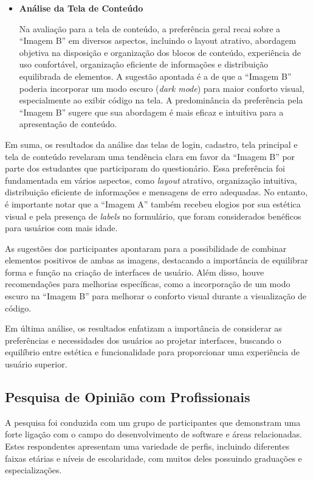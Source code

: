 \begin{itemize}
    \item \textbf{Análise da Tela de Conteúdo}
    
    Na avaliação para a tela de conteúdo, a preferência geral recai sobre a ``Imagem B'' em diversos aspectos, incluindo o layout atrativo, abordagem objetiva na disposição e organização dos blocos de conteúdo, experiência de uso confortável, organização eficiente de informações e distribuição equilibrada de elementos. A sugestão apontada é a de que a ``Imagem B'' poderia incorporar um modo escuro (\textit{dark mode}) para maior conforto visual, especialmente ao exibir código na tela. A predominância da preferência pela ``Imagem B'' sugere que sua abordagem é mais eficaz e intuitiva para a apresentação de conteúdo.
\end{itemize}

Em suma, os resultados da análise das telas de login, cadastro, tela principal e tela de conteúdo revelaram uma tendência clara em favor da ``Imagem B'' por parte dos estudantes que participaram do questionário. Essa preferência foi fundamentada em vários aspectos, como \textit{layout} atrativo, organização intuitiva, distribuição eficiente de informações e mensagens de erro adequadas. No entanto, é importante notar que a ``Imagem A'' também recebeu elogios por sua estética visual e pela presença de \textit{labels} no formulário, que foram considerados benéficos para usuários com mais idade.

As sugestões dos participantes apontaram para a possibilidade de combinar elementos positivos de ambas as imagens, destacando a importância de equilibrar forma e função na criação de interfaces de usuário. Além disso, houve recomendações para melhorias específicas, como a incorporação de um modo escuro na ``Imagem B'' para melhorar o conforto visual durante a visualização de código.

Em última análise, os resultados enfatizam a importância de considerar as preferências e necessidades dos usuários ao projetar interfaces, buscando o equilíbrio entre estética e funcionalidade para proporcionar uma experiência de usuário superior.


\vspace{10pt}
\subsection{Pesquisa de Opinião com Profissionais}
\label{Pesquisa_de_Opinião_com_Profissionais}

A pesquisa foi conduzida com um grupo de participantes que demonstram uma forte ligação com o campo do desenvolvimento de software e áreas relacionadas. Estes respondentes apresentam uma variedade de perfis, incluindo diferentes faixas etárias e níveis de escolaridade, com muitos deles possuindo graduações e especializações.

